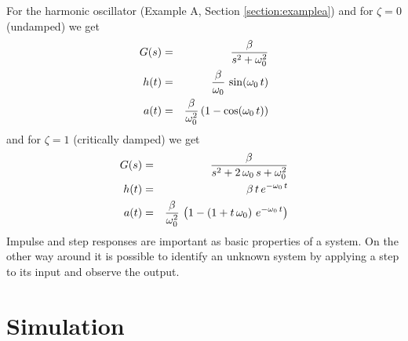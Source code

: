 \documentclass[a4paper,12pt]{article}
\newcommand{\Section}[2]{\section{#2}\label{section:#1}}
\newcommand{\SRef}[1]{Section \ref{section:#1}}
\begin{document}
For the harmonic oscillator (Example A, \SRef{examplea}) and for $\zeta=0$ (undamped) we get
\begin{eqnarray}
G(s)&=&\frac{\beta}{s^2+\omega_0^2}\\
h(t)&=&{{\beta}\over{\omega_0}}\,\sin(\omega_0\,t)\\
a(t)&=&{{\beta}\over{\omega_0^2}}\left(1-\cos(\omega_0\,t)\right)
\end{eqnarray}
and for $\zeta=1$ (critically damped) we get
\begin{eqnarray}
G(s)&=&\frac{\beta}{s^2+2\,\omega_0\,s+\omega_0^2}\\
h(t)&=&\beta\,t\,e^{-\omega_0\,t}\\
a(t)&=&{{\beta}\over{\omega_0^2}}\,\left(1-\left(1+t\,\omega_0\right)\,e^{-\omega_0\,t}\right)
\end{eqnarray}
Impulse and step responses are important as basic properties of a system. On the other way around it is possible to identify an unknown system by applying a step to its input and observe the output.

\Section{simu}{Simulation}

\end{document}

